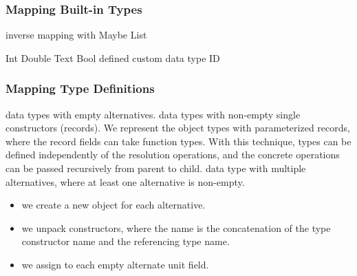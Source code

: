 \begin{frame}\frametitle{Mapping Built-in Types}
\begin{itemize}
  \begin{itemize}
     inverse mapping with Maybe
     List
  \end{itemize}
  \begin{itemize}
     Int
     Double
     Text
     Bool
      defined custom data type ID 
  \end{itemize}
\end{itemize}
\end{frame}

\begin{frame}\frametitle{Mapping Type Definitions}

\begin{itemize}
   data types with empty alternatives.
   data types with non-empty single constructors (records). 
   We represent the object types with parameterized records, where the record fields can take function types. With this technique, types can be defined independently of the resolution operations, and the concrete operations can be passed recursively from parent to child. 
   data type with multiple alternatives, where at least one alternative is non-empty.
  \begin{itemize}
    \item we create a new object for each alternative.
    \item we unpack constructors, where the name is the concatenation of the type constructor name and the referencing type name. 
    \item we assign to each empty alternate unit field.
  \end{itemize}
\end{itemize}

\end{frame}

